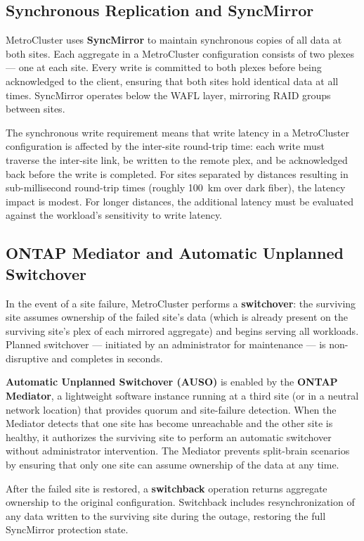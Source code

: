\subsection{Synchronous Replication and SyncMirror}

MetroCluster uses \textbf{SyncMirror} to maintain synchronous copies of all data at both sites. Each aggregate in a MetroCluster configuration consists of two plexes --- one at each site. Every write is committed to both plexes before being acknowledged to the client, ensuring that both sites hold identical data at all times. SyncMirror operates below the WAFL layer, mirroring RAID groups between sites.

The synchronous write requirement means that write latency in a MetroCluster configuration is affected by the inter-site round-trip time: each write must traverse the inter-site link, be written to the remote plex, and be acknowledged back before the write is completed. For sites separated by distances resulting in sub-millisecond round-trip times (roughly 100~km over dark fiber), the latency impact is modest. For longer distances, the additional latency must be evaluated against the workload's sensitivity to write latency.

\subsection{ONTAP Mediator and Automatic Unplanned Switchover}

In the event of a site failure, MetroCluster performs a \textbf{switchover}: the surviving site assumes ownership of the failed site's data (which is already present on the surviving site's plex of each mirrored aggregate) and begins serving all workloads. Planned switchover --- initiated by an administrator for maintenance --- is non-disruptive and completes in seconds.

\textbf{Automatic Unplanned Switchover (AUSO)} is enabled by the \textbf{ONTAP Mediator}, a lightweight software instance running at a third site (or in a neutral network location) that provides quorum and site-failure detection. When the Mediator detects that one site has become unreachable and the other site is healthy, it authorizes the surviving site to perform an automatic switchover without administrator intervention. The Mediator prevents split-brain scenarios by ensuring that only one site can assume ownership of the data at any time.

After the failed site is restored, a \textbf{switchback} operation returns aggregate ownership to the original configuration. Switchback includes resynchronization of any data written to the surviving site during the outage, restoring the full SyncMirror protection state.

